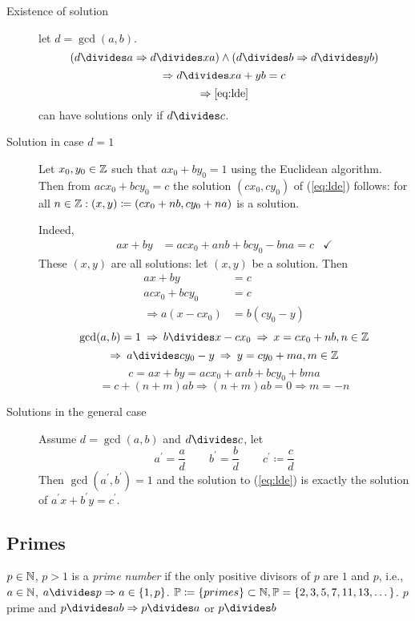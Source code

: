 \documentclass[NumTh.tex]{subfiles}
\begin{document}
\begin{description}
  \item[Existence of solution] let $d = \gcd(a,b)$.
    \[
	    (d\divides a \Rightarrow d\divides xa) \land
	    (d\divides b \Rightarrow d\divides yb)
	\] \[
	    \Rightarrow d\divides xa+yb = c \\
	\] \[
	    \Rightarrow \cref{eq:lde}
	\]
	can have solutions only if $d\divides c$.

  \item[Solution in case $d=1$]
    Let $x_0,y_0 \in \mathbb{Z}$ such that $ax_0+by_0 = 1$ using the Euclidean algorithm.
    Then from $acx_0 + bcy_0 = c$ the solution $(cx_0, cy_0)$ of (\cref{eq:lde})
    follows: for all $n \in \mathbb{Z}: (x,y) \coloneq (cx_0+nb,cy_0+na)$ is a solution.
  
	Indeed,
	\begin{align*}
	  ax+by &= acx_0 + anb + bcy_0 - bna = c &\checkmark
	\end{align*}
    These $(x,y)$ are all solutions: let $(x,y)$ be a solution. Then
	\begin{align*}
	   ax + by &= c \\
	   acx_0 + bcy_0 &= c \\
	   \Rightarrow a(x-cx_0) &= b(cy_0-y)
	\end{align*}
	\[ \gcd(a,b) = 1 \:\Rightarrow\: b \divides x - cx_0 \:\Rightarrow\: x = cx_0 + nb, n \in \Z \]
	\[ \Rightarrow\: a \divides cy_0 - y \:\Rightarrow\: y = cy_0 + ma, m\in \Z \]
    \[ c = ax+by = acx_0 + anb + bcy_0 + bma \]
    \[ = c + (n+m)ab \Rightarrow (n+m)ab = 0 \Rightarrow m = -n \]
  
  \item[Solutions in the general case] Assume $d = \gcd(a,b)$ and $d\divides c$, let
    \[
		a^\prime = \frac{a}{d} \hspace{25pt}
		b^\prime = \frac{b}{d} \hspace{25pt}
		c^\prime \coloneq \frac{c}{d}
	\]
    Then $\gcd(a^\prime, b^\prime) = 1$ and the solution to (\cref{eq:lde}) is exactly the solution of $a^\prime x + b^\prime y = c^\prime$.
\end{description}

\subsection{Primes}

\begin{defi}\label{def_0_2_1}
$p \in \mathbb{N}$, $p > 1$ is a \emph{prime number} if the only positive divisors of $p$ are $1$ and $p$, i.e., $a \in \mathbb{N}$, $a\divides p \Rightarrow a \in \{1,p\}$.
$\mathbb{P} \coloneq \{ primes\} \subset \mathbb{N}, \mathbb{P} = \{2,3,5,7,11,13,\dots\}$.
$p$ prime and $p\divides ab \Rightarrow p\divides a$ or $p\divides b$
\end{defi}
\end{document}
